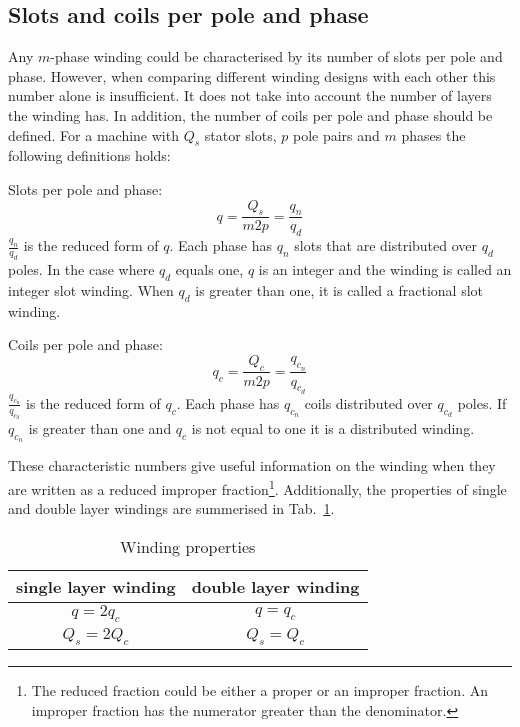 \subsection{Slots and coils per pole and phase} \label{subsec:slots_coils}
Any $m$-phase winding could be characterised by its number of slots per pole and phase. However, when comparing different winding designs with each other this number alone is insufficient. It does not take into account the number of layers the winding has. In addition, the number of coils per pole and phase should be defined. For a machine with $Q_s$ stator slots, $p$ pole pairs and $m$ phases the following definitions holds:
\begin{defth}
Slots per pole and phase: 
\begin{equation}
  q =\frac{Q_{s}}{m2p}=\frac{q_{n}}{q_{d}}
\end{equation}
$\frac{q_{n}}{q_{d}}$ is the reduced form of $q$. Each phase has $q_n$ slots that are distributed over $q_d$ poles. In the case where $q_d$ equals one, $q$ is an integer and the winding is called an integer slot winding. When $q_d$ is greater than one, it is called a fractional slot winding. 
\end{defth}
\begin{defth}
Coils per pole and phase: 
\begin{equation}
  q_{c}=\frac{Q_{c}}{m2p}=\frac{q_{c_n}}{q_{c_d}}
\end{equation}
$\frac{q_{c_n}}{q_{c_d}}$ is the reduced form of $q_c$. Each phase has $q_{c_n}$ coils distributed over $q_{c_d}$ poles. If $q_{c_n}$ is greater than one and $q_c$ is not equal to one it is a distributed winding. 
\end{defth}
These characteristic numbers give useful information on the winding when they are written as a reduced improper fraction\footnote{The reduced fraction could be either a proper or an improper fraction. An improper fraction has the numerator greater than the denominator.}. Additionally, the properties of single and double layer windings are summerised in Tab.~\ref{tab:properties_single_double}. 

{\renewcommand{\arraystretch}{1.2}
\begin{table}[htbp]
	\caption{Winding properties}
	\label{tab:properties_single_double}
  \centering
  \begin{tabular}{|c|c|}
  \hline
	single layer winding & double layer winding \\
	\hline
	$q = 2q_c$ & $q = q_c$ \\
	$Q_s = 2Q_c$ &  $Q_s = Q_c$ \\
	\hline
	\end{tabular}
\end{table}}

